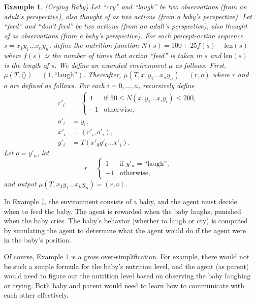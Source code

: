 \documentclass{article}
\newtheorem{myexample}[mytheorem]{Example}
\begin{document}
\begin{myexample}
\label{cryingbabyexample}
  (Crying Baby)
  Let ``cry'' and ``laugh'' be two observations (from an adult's perspective),
  also thought of as two actions (from a baby's perspective).
  Let ``feed'' and ``don't feed'' be two actions (from an adult's perspective),
  also thought of as observations (from a baby's perspective).
  For each percept-action sequence $s=x_1y_1\ldots x_ny_n$, define the
  nutrition function $N(s)=100+25f(s)-\mbox{len}(s)$ where $f(s)$ is the number
  of times that action ``feed'' is taken in $s$ and $\mbox{len}(s)$ is the length of $s$.
  We define an extended environment $\mu$ as follows.
  First, $\mu(T,\langle\rangle)=(1,\mbox{``laugh''})$.
  Thereafter, $\mu(T,x_1y_1\ldots x_ny_n)=(r,o)$ where $r$ and $o$ are defined as follows.
  For each $i=0,\ldots,n$, recursively define
  \begin{align*}
    r'_i &=
      \begin{cases}
        1 & \mbox{if $50 \leq N(x_1y_1\ldots x_iy_i)\leq 200$,}\\
        -1 & \mbox{otherwise,}
      \end{cases}\\
    o'_i &= y_i,\\
    x'_i &= (r'_i,o'_i),\\
    y'_i &= T(x'_0y'_0 \ldots x'_i).
  \end{align*}
  Let $o=y'_n$, let
  \[
    r=
      \begin{cases}
        1 & \mbox{if $y'_n=\mbox{``laugh''}$,}\\
        -1 & \mbox{otherwise,}
      \end{cases}
  \]
  and output $\mu(T,x_1y_1\ldots x_ny_n)=(r,o)$.
\end{myexample}

In Example \ref{cryingbabyexample}, the environment consists of a baby, and the
agent must decide when to feed the baby. The agent is rewarded when the baby laughs,
punished when the baby cries. The baby's behavior (whether to laugh or cry) is computed
by simulating the agent to determine what the agent would do if the agent were in the
baby's position.

Of course, Example \ref{cryingbabyexample} is a gross
over-simplification. For example, there would not be such a simple formula for the
baby's nutrition level, and the agent (as parent) would need to figure out the nutrition level
based on observing the baby laughing or crying. Both baby and parent would need to
learn how to communicate with each other effectively.
\end{document}

